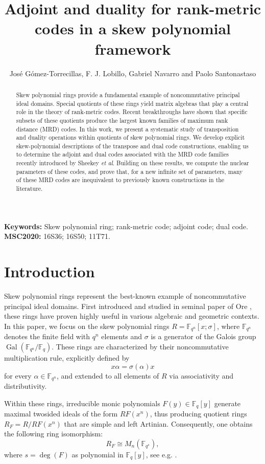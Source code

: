 \documentclass[a4paper, 11pt]{article}
\title{Adjoint and duality for rank-metric codes in a skew polynomial framework}
\author{José G\'omez-Torrecillas, F. J. Lobillo, Gabriel Navarro and Paolo Santonastaso}
\date{}
\DeclareMathOperator{\Gal}{Gal}
\newcommand{\F}{{\mathbb F}}
\begin{document}
\maketitle

\begin{abstract}
Skew polynomial rings provide a fundamental example of noncommutative principal ideal domains. Special quotients of these rings yield matrix algebras that play a central role in the theory of rank-metric codes. Recent breakthroughs have shown that specific subsets of these quotients produce the largest known families of maximum rank distance (MRD) codes. In this work, we present a systematic study of transposition and duality operations within quotients of skew polynomial rings. We develop explicit skew-polynomial descriptions of the transpose and dual code constructions, enabling us to determine the adjoint and dual codes associated with the MRD code families recently introduced by Sheekey \emph{et al}. Building on these results, we compute the nuclear parameters of these codes, and prove that, for a new infinite set of parameters, many of these MRD codes are inequivalent to previously known constructions in the literature.
\end{abstract}

\textbf{Keywords:} Skew polynomial ring; rank-metric code; adjoint code; dual code.\\
\textbf{MSC2020:}  16S36; 16S50; 11T71.


\section{Introduction}


Skew polynomial rings represent the best-known example of noncommutative principal ideal domains. First introduced and studied in seminal paper of Ore \cite{ore1933theory}, these rings have proven highly useful in various algebraic and geometric contexts. In this paper, we focus on the skew polynomial rings $R=\mathbb{F}_{q^n}[x;\sigma]$, where $\mathbb{F}_{q^n}$ denotes the finite field with $q^n$ elements and $\sigma$ is a generator of the Galois group $\Gal(\mathbb{F}_{q^n}/\mathbb{F}_q)$. These rings are characterized by their noncommutative multiplication rule, explicitly defined by
\[
x \alpha = \sigma(\alpha) x
\]
for every $\alpha \in \mathbb{F}_{q^n}$, and extended to all elements of $R$ via associativity and distributivity.

Within these rings, irreducible monic polynomials $F(y) \in \mathbb{F}_q[y]$ generate maximal twosided ideals of the form $RF(x^n)$, thus producing quotient rings $R_F = R/RF(x^n)$ that are simple and left Artinian. Consequently, one obtains the following ring isomorphism:
\begin{equation}  \label{eq:isomorphismRF}
R_F \cong M_n\left(\F_{q^{s}}\right) 
,\end{equation}
where \(s = \deg(F)\) as polynomial in \(\F_q[y]\), 
see e.g. \cite[Theorem 1.2.19]{jacobson2009finite}. 
\end{document}
